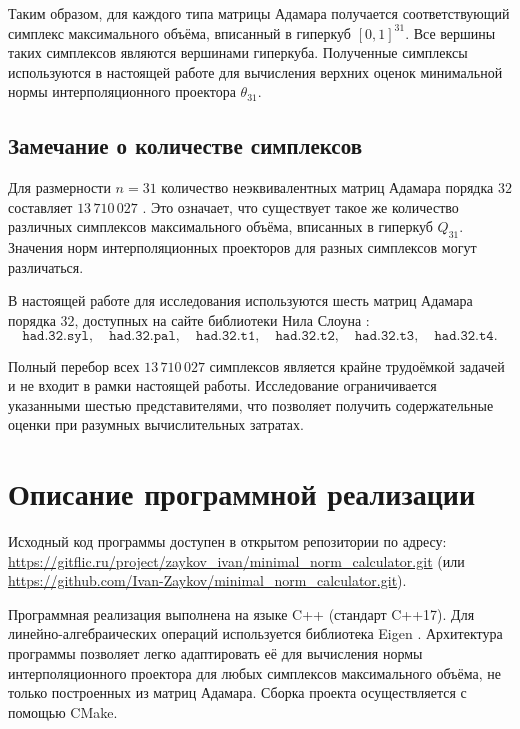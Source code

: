\documentclass[a4paper,12pt]{article}
\theoremstyle{indented}
\begin{document}
Таким образом, для каждого типа матрицы Адамара получается соответствующий симплекс максимального объёма, вписанный в гиперкуб $[0,1]^{31}$. Все вершины таких симплексов являются вершинами гиперкуба. Полученные симплексы используются в настоящей работе для вычисления верхних оценок минимальной нормы интерполяционного проектора $\theta_{31}$.

\subsection{Замечание о количестве симплексов}

Для размерности $n = 31$ количество неэквивалентных матриц Адамара порядка $32$ составляет $13\,710\,027$ \cite{kharaghani2013hadamard}. Это означает, что существует такое же количество различных симплексов максимального объёма, вписанных в гиперкуб $Q_{31}$. Значения норм интерполяционных проекторов для разных симплексов могут различаться.
\par
В настоящей работе для исследования используются шесть матриц Адамара порядка $32$, доступных на сайте библиотеки Нила Слоуна \cite{sloane_hadamard}:
\[
\texttt{had.32.syl},\quad \texttt{had.32.pal},\quad \texttt{had.32.t1},\quad \texttt{had.32.t2},\quad \texttt{had.32.t3},\quad \texttt{had.32.t4}.
\]

Полный перебор всех $13\,710\,027$ симплексов является крайне трудоёмкой задачей и не входит в рамки настоящей работы. Исследование ограничивается указанными шестью представителями, что позволяет получить содержательные оценки при разумных вычислительных затратах.
\section{Описание программной реализации}

Исходный код программы доступен в открытом репозитории по адресу:
\url{https://gitflic.ru/project/zaykov_ivan/minimal_norm_calculator.git} (или \url{https://github.com/Ivan-Zaykov/minimal_norm_calculator.git}).

Программная реализация выполнена на языке C++ (стандарт C++17). Для линейно-алгебраических операций используется библиотека Eigen \cite{eigen_lib}. Архитектура программы позволяет легко адаптировать её для вычисления нормы интерполяционного проектора для любых симплексов максимального объёма, не только построенных из матриц Адамара. Сборка проекта осуществляется с помощью CMake.
\end{document}
